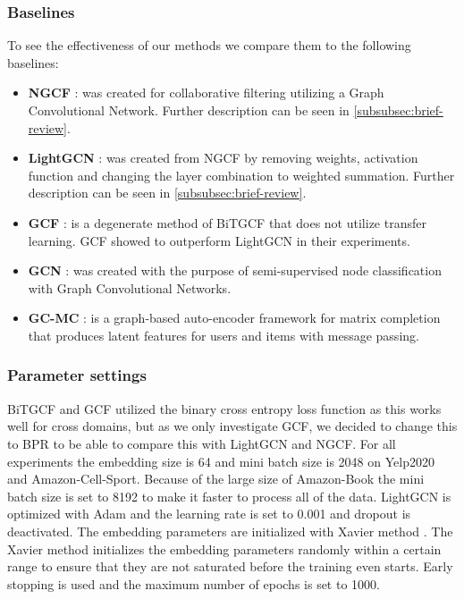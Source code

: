 \subsubsection{Baselines}
To see the effectiveness of our methods we compare them to the following baselines:
\begin{itemize}
    \item \textbf{NGCF} \cite{NGCF_2019}: was created for collaborative filtering utilizing a Graph Convolutional Network. Further description can be seen in \autoref{subsubsec:brief-review}.
    \item \textbf{LightGCN} \cite{lightgcn}: was created from NGCF by removing weights, activation function and changing the layer combination to weighted summation. Further description can be seen in \autoref{subsubsec:brief-review}.
    \item \textbf{GCF} \cite{BiTGCF}: is a degenerate method of BiTGCF that does not utilize transfer learning. GCF showed to outperform LightGCN in their experiments.
    \item \textbf{GCN} \cite{GCN}: was created with the purpose of semi-supervised node classification with Graph Convolutional Networks.
    \item \textbf{GC-MC} \cite{GC_MC}: is a graph-based auto-encoder framework for matrix completion that produces latent features for users and items with message passing.
\end{itemize}

\subsubsection{Parameter settings}
BiTGCF and GCF utilized the binary cross entropy loss function as this works well for cross domains, but as we only investigate GCF, we decided to change this to BPR to be able to compare this with LightGCN and NGCF.
For all experiments the embedding size is 64 and mini batch size is 2048 on Yelp2020 and Amazon-Cell-Sport.
Because of the large size of Amazon-Book the mini batch size is set to 8192 to make it faster to process all of the data.
LightGCN is optimized with Adam \cite{Adam} and the learning rate is set to 0.001 and dropout is deactivated.
The embedding parameters are initialized with Xavier method \cite{Xavier,lightgcn}.
The Xavier method initializes the embedding parameters randomly within a certain range to ensure that they are not saturated before the training even starts.
Early stopping is used and the maximum number of epochs is set to 1000.
